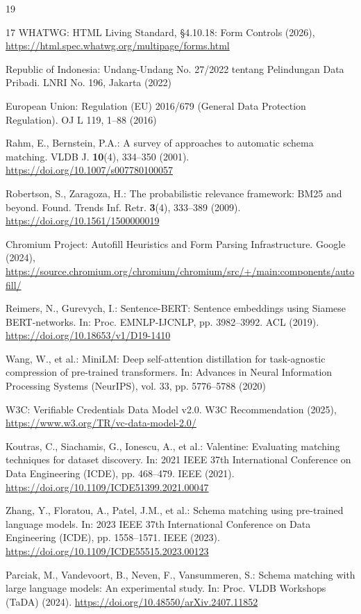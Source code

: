 \documentclass[runningheads,a4paper]{llncs}
\begin{document}
\begin{thebibliography}{19}
\begin{thebibliography}{17}
WHATWG: HTML Living Standard, \S 4.10.18: Form Controls (2026), \url{https://html.spec.whatwg.org/multipage/forms.html}

Republic of Indonesia: Undang-Undang No. 27/2022 tentang Pelindungan Data Pribadi. LNRI No. 196, Jakarta (2022)

European Union: Regulation (EU) 2016/679 (General Data Protection Regulation). OJ L 119, 1--88 (2016)

Rahm, E., Bernstein, P.A.: A survey of approaches to automatic schema matching. VLDB J. \textbf{10}(4), 334--350 (2001). \url{https://doi.org/10.1007/s007780100057}

Robertson, S., Zaragoza, H.: The probabilistic relevance framework: BM25 and beyond. Found. Trends Inf. Retr. \textbf{3}(4), 333--389 (2009). \url{https://doi.org/10.1561/1500000019}

Chromium Project: Autofill Heuristics and Form Parsing Infrastructure. Google (2024), \url{https://source.chromium.org/chromium/chromium/src/+/main:components/autofill/}

Reimers, N., Gurevych, I.: Sentence-BERT: Sentence embeddings using Siamese BERT-networks. In: Proc. EMNLP-IJCNLP, pp. 3982--3992. ACL (2019). \url{https://doi.org/10.18653/v1/D19-1410}

Wang, W., et al.: MiniLM: Deep self-attention distillation for task-agnostic compression of pre-trained transformers. In: Advances in Neural Information Processing Systems (NeurIPS), vol. 33, pp. 5776--5788 (2020)

W3C: Verifiable Credentials Data Model v2.0. W3C Recommendation (2025), \url{https://www.w3.org/TR/vc-data-model-2.0/}

Koutras, C., Siachamis, G., Ionescu, A., et al.: Valentine: Evaluating matching techniques for dataset discovery. In: 2021 IEEE 37th International Conference on Data Engineering (ICDE), pp. 468--479. IEEE (2021). \url{https://doi.org/10.1109/ICDE51399.2021.00047}

Zhang, Y., Floratou, A., Patel, J.M., et al.: Schema matching using pre-trained language models. In: 2023 IEEE 37th International Conference on Data Engineering (ICDE), pp. 1558--1571. IEEE (2023). \url{https://doi.org/10.1109/ICDE55515.2023.00123}

Parciak, M., Vandevoort, B., Neven, F., Vansummeren, S.: Schema matching with large language models: An experimental study. In: Proc. VLDB Workshops (TaDA) (2024). \url{https://doi.org/10.48550/arXiv.2407.11852}


\end{thebibliography}
\end{thebibliography}
\end{document}
